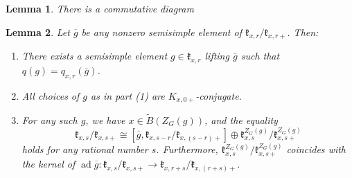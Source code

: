 \documentclass[10pt,a4paper]{amsart}
\newtheorem{lemma}{Lemma}
\newcommand{\on}{\operatorname}
\begin{document}
\begin{lemma}\label{fqcompatibility}
There is a commutative diagram

\begin{center}
\end{center}
\end{lemma}

\begin{lemma}\label{inverseconstruction}
Let $\overline{g}$ be any nonzero semisimple element of $\mathfrak{k}_{x,r}/\mathfrak{k}_{x,r+}$. Then:
\begin{enumerate}
\item There exists a semisimple element $g\in\mathfrak{k}_{x,r}$ lifting $\overline{g}$ such that $q(g)=q_{x,r}(\overline{g})$.
\item All choices of $g$ as in part (1) are $K_{x,0+}$-conjugate.
\item For any such $g$, we have $x\in\widetilde{B}(Z_G(g))$, and the equality
\begin{equation}\label{eq:centralizerdecomp}
\mathfrak{k}_{x,s}/\mathfrak{k}_{x,s+}\cong[\overline{g},\mathfrak{k}_{x,s-r}/\mathfrak{k}_{x,(s-r)+}]\oplus\mathfrak{k}^{Z_G(g)}_{x,s}/\mathfrak{k}^{Z_G(g)}_{x,s+}
\end{equation}
holds for any rational number $s$. Furthermore, $\mathfrak{k}^{Z_G(g)}_{x,s}/\mathfrak{k}^{Z_G(g)}_{x,s+}$ coincides with the kernel of $\on{ad}\overline{g}:\mathfrak{k}_{x,s}/\mathfrak{k}_{x,s+}\rightarrow\mathfrak{k}_{x,r+s}/\mathfrak{k}_{x,(r+s)+}$.
\end{enumerate}
\end{lemma}
\end{document}
